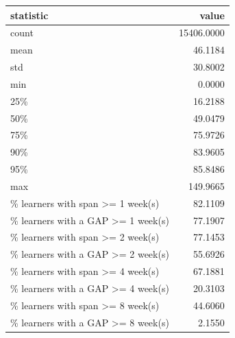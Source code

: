 \begin{tabular}{lr}
\toprule
statistic & value \\
\midrule
count & 15406.0000 \\
mean & 46.1184 \\
std & 30.8002 \\
min & 0.0000 \\
25\% & 16.2188 \\
50\% & 49.0479 \\
75\% & 75.9726 \\
90\% & 83.9605 \\
95\% & 85.8486 \\
max & 149.9665 \\
\% learners with span >= 1 week(s) & 82.1109 \\
\% learners with a GAP >= 1 week(s) & 77.1907 \\
\% learners with span >= 2 week(s) & 77.1453 \\
\% learners with a GAP >= 2 week(s) & 55.6926 \\
\% learners with span >= 4 week(s) & 67.1881 \\
\% learners with a GAP >= 4 week(s) & 20.3103 \\
\% learners with span >= 8 week(s) & 44.6060 \\
\% learners with a GAP >= 8 week(s) & 2.1550 \\
\bottomrule
\end{tabular}
